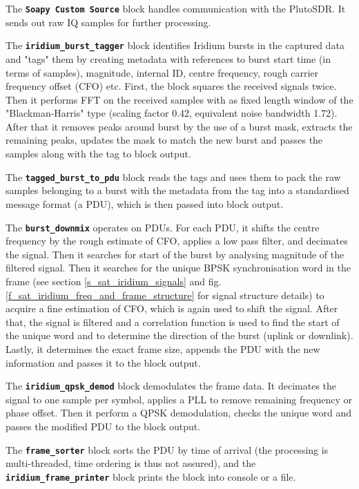 The \textbf{\texttt{Soapy Custom Source}} block handles communication with the PlutoSDR. It sends out raw IQ samples for further processing.

The \textbf{\texttt{iridium\_burst\_tagger}} block identifies Iridium bursts in the captured data and "tags" them by creating metadata with references to burst start time (in terms of samples), magnitude, internal ID, centre frequency, rough carrier frequency offset (CFO) etc. First, the block squares the received signals twice. Then it performs FFT on the received samples with as fixed length window of the "Blackman-Harris" type (scaling factor \num{0.42}, equivalent noise bandwidth \num{1.72})\cite{des08}. After that it removes peaks around burst by the use of a burst mask, extracts the remaining peaks, updates the mask to match the new burst and passes the samples along with the tag to block output.

The \textbf{\texttt{tagged\_burst\_to\_pdu}} block reads the tags and uses them to pack the raw samples belonging to a burst with the metadata from the tag into a standardised message format (a PDU), which is then passed into block output.

The \textbf{\texttt{burst\_downmix}} operates on PDUs. For each PDU, it shifts the centre frequency by the rough estimate of CFO, applies a low pass filter, and decimates the signal. Then it searches for start of the burst by analysing magnitude of the filtered signal. Then it searches for the unique BPSK synchronisation word in the frame (see section \ref{s_sat_iridium_signals} and fig. \ref{f_sat_iridium_freq_and_frame_structure} for signal structure details) to acquire a fine estimation of CFO, which is again used to shift the signal. After that, the signal is filtered and a correlation function is used to find the start of the unique word and to determine the direction of the burst (uplink or downlink). Lastly, it determines the exact frame size, appends the PDU with the new information and passes it to the block output.

The \textbf{\texttt{iridium\_qpsk\_demod}} block demodulates the frame data. It decimates the signal to one sample per symbol, applies a PLL to remove remaining frequency or phase offset. Then it perform a QPSK demodulation, checks the unique word and passes the modified PDU to the block output.

The \textbf{\texttt{frame\_sorter}} block sorts the PDU by time of arrival (the processing is multi-threaded, time ordering is thus not assured), and the \textbf{\texttt{iridium\_frame\_printer}} block prints the block into console or a file.



